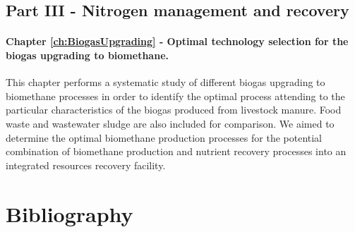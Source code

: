 \begin{refsection}[referencesCh1]
\subsection{Part III - Nitrogen management and recovery}
\paragraph{Chapter \ref{ch:BiogasUpgrading} - Optimal technology selection for the biogas upgrading to biomethane.} This chapter performs a systematic study of different biogas upgrading to biomethane processes in order to identify the optimal process attending to the particular characteristics of the biogas produced from livestock manure. Food waste and wastewater sludge are also included for comparison. We aimed to determine the optimal biomethane production processes for the potential combination of biomethane production and nutrient recovery processes into an integrated resources recovery facility.

\section*{Bibliography}
\printbibliography[heading=none]
\end{refsection}
